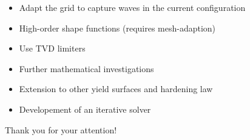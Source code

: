 \documentclass[11pt,aspectratio=169]{beamer}
\begin{document}
\begin{frame}[standout]{}
  \begin{footnotesize}
    \begin{block}{}
      \begin{itemize}
      \item[] Adapt the grid to capture waves in the current configuration
      \item[] High-order shape functions (requires mesh-adaption)
      \item[] Use TVD limiters
      \end{itemize}
    \end{block}

    
    \begin{block}{}
      \begin{itemize}
      \item[] Further mathematical investigations
      \item[] Extension to other yield surfaces and hardening law
      \item[] Developement of an iterative solver
      \end{itemize}
    \end{block}
  \end{footnotesize}
\end{frame}

\begin{frame}[standout]{}
  Thank you for your attention!
\end{frame}
  
\end{document}
